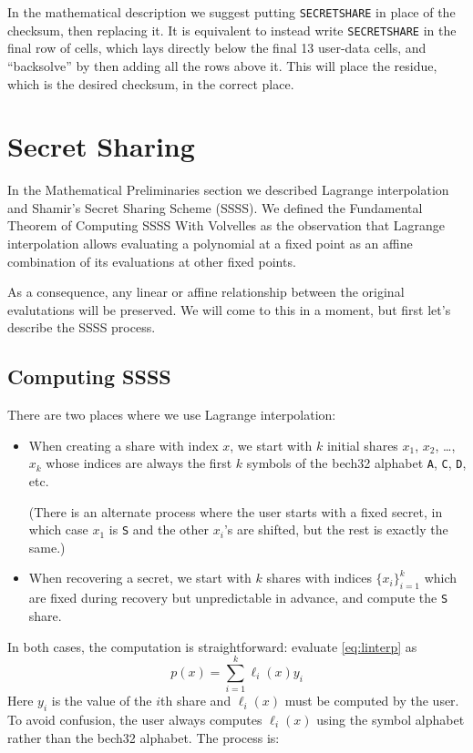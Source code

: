\documentclass[letterpaper]{article}
\theoremstyle{xxx}
\theoremstyle{evil}
\theoremstyle{yyy}
\theoremstyle{plain}
\theoremstyle{zzz}
\newcommand{\vc}[1]{\texttt{#1}} %
\begin{document}
In the mathematical description we suggest putting \vc{SECRETSHARE} in place of
the checksum, then replacing it. It is equivalent to instead write \vc{SECRETSHARE}
in the final row of cells, which lays directly below the final 13 user-data cells, and
``backsolve'' by then adding all the rows above it. This will place the residue, which
is the desired checksum, in the correct place.

\section{Secret Sharing}

In the Mathematical Preliminaries section we described Lagrange interpolation and
Shamir's Secret Sharing Scheme (SSSS). We defined the Fundamental Theorem of Computing
SSSS With Volvelles as the observation that Lagrange interpolation allows evaluating
a polynomial at a fixed point as an affine combination of its evaluations at other
fixed points.

As a consequence, any linear or affine relationship between the original evalutations
will be preserved. We will come to this in a moment, but first let's describe the SSSS
process.

\subsection{Computing SSSS}

There are two places where we use Lagrange interpolation:
\begin{itemize}
\item When creating a share with index $x$, we start with $k$ initial shares $x_1$,
$x_2$, \ldots, $x_k$ whose indices are always the first $k$ symbols of the bech32
alphabet \vc{A}, \vc{C}, \vc{D}, etc.

(There is an alternate process where the user starts with a fixed secret, in which
case $x_1$ is \vc{S} and the other $x_i$'s are shifted, but the rest is exactly
the same.)
\item When recovering a secret, we start with $k$ shares with indices $\{x_i\}_{i=1}^k$
which are fixed during recovery but unpredictable in advance, and compute the
\vc{S} share.
\end{itemize}

In both cases, the computation is straightforward: evaluate \eqref{eq:linterp} as
\[ p(x) = \sum_{i=1}^k \ell_i(x) y_i \]
Here $y_i$ is the value of the $i$th share and $\ell_i(x)$ must be computed by the
user. To avoid confusion, the user always computes $\ell_i(x)$ using the symbol
alphabet rather than the bech32 alphabet. The process is:
\end{document}
